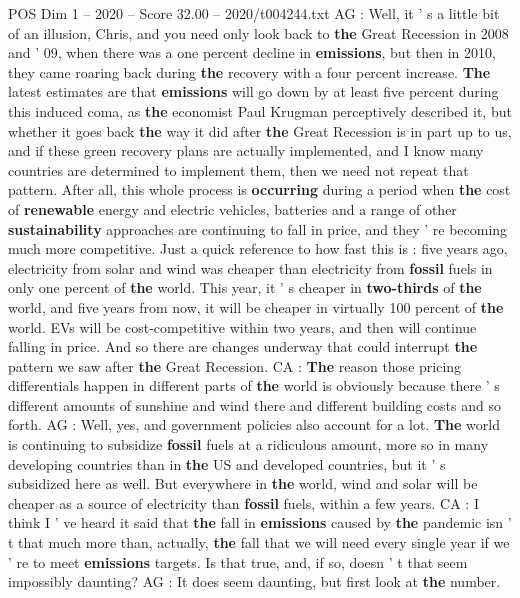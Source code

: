 \begin{textsample}{POS Dim 1 – 2020 – Score 32.00 – 2020/t004244.txt}
AG : Well, it ' s a little bit of an illusion, Chris, and you need only look back to \textbf{the} Great Recession in 2008 and ' 09, when there was a one percent decline in \textbf{emissions}, but then in 2010, they came roaring back during \textbf{the} recovery with a four percent increase. \textbf{The} latest estimates are that \textbf{emissions} will go down by at least five percent during this induced coma, as \textbf{the} economist Paul Krugman perceptively described it, but whether it goes back \textbf{the} way it did after \textbf{the} Great Recession is in part up to us, and if these green recovery plans are actually implemented, and I know many countries are determined to implement them, then we need not repeat that pattern.
After all, this whole process is \textbf{occurring} during a period when \textbf{the} cost of \textbf{renewable} energy and electric vehicles, batteries and a range of other \textbf{sustainability} approaches are continuing to fall in price, and they ' re becoming much more competitive.
Just a quick reference to how fast this is : five years ago, electricity from solar and wind was cheaper than electricity from \textbf{fossil} fuels in only one percent of \textbf{the} world.
This year, it ' s cheaper in \textbf{two-thirds} of \textbf{the} world, and five years from now, it will be cheaper in virtually 100 percent of \textbf{the} world.
EVs will be cost-competitive within two years, and then will continue falling in price.
And so there are changes underway that could interrupt \textbf{the} pattern we saw after \textbf{the} Great Recession.
CA : \textbf{The} reason those pricing differentials happen in different parts of \textbf{the} world is obviously because there ' s different amounts of sunshine and wind there and different building costs and so forth.
AG : Well, yes, and government policies also account for a lot. \textbf{The} world is continuing to subsidize \textbf{fossil} fuels at a ridiculous amount, more so in many developing countries than in \textbf{the} US and developed countries, but it ' s subsidized here as well.
But everywhere in \textbf{the} world, wind and solar will be cheaper as a source of electricity than \textbf{fossil} fuels, within a few years.
CA : I think I ' ve heard it said that \textbf{the} fall in \textbf{emissions} caused by \textbf{the} pandemic isn ' t that much more than, actually, \textbf{the} fall that we will need every single year if we ' re to meet \textbf{emissions} targets.
Is that true, and, if so, doesn ' t that seem impossibly daunting?
AG : It does seem daunting, but first look at \textbf{the} number.

\end{textsample}
